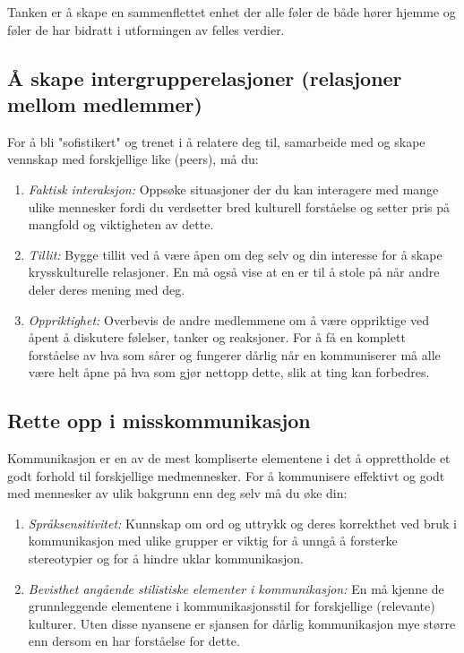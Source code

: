 \documentclass[11pt]{article}
\begin{document}
				Tanken er å skape en sammenflettet enhet der alle føler de både hører hjemme og føler de har bidratt i utformingen av felles verdier.
				
		\subsection{Å skape intergrupperelasjoner (relasjoner mellom medlemmer)}
			For å bli "sofistikert" og trenet i å relatere deg til, samarbeide med og skape vennskap med forskjellige like (peers), må du:
			\begin{enumerate}
				\item \textit{Faktisk interaksjon:} Oppsøke situasjoner der du kan interagere med mange ulike mennesker fordi du verdsetter bred kulturell forståelse og setter pris på mangfold og viktigheten av dette.
				\item \textit{Tillit:} Bygge tillit ved å være åpen om deg selv og din interesse for å skape krysskulturelle relasjoner. En må også vise at en er til å stole på når andre deler deres mening med deg.
				
				\item \textit{Oppriktighet:} Overbevis de andre medlemmene om å være oppriktige ved åpent å diskutere følelser, tanker og reaksjoner. For å få en komplett forståelse av hva som sårer og fungerer dårlig når en kommuniserer må alle være helt åpne på hva som gjør nettopp dette, slik at ting kan forbedres.
			\end{enumerate}
			
		\subsection{Rette opp i misskommunikasjon}
			Kommunikasjon er en av de mest kompliserte elementene i det å opprettholde et godt forhold til forskjellige medmennesker. For å kommunisere effektivt og godt med mennesker av ulik bakgrunn enn deg selv må du øke din:
			
			\begin{enumerate}
				\item \textit{Språksensitivitet:} Kunnskap om ord og uttrykk og deres korrekthet ved bruk i kommunikasjon med ulike grupper er viktig for å unngå å forsterke stereotypier og for å hindre uklar kommunikasjon.
				\item \textit{Bevisthet angående stilistiske elementer i kommunikasjon:} En må kjenne de grunnleggende elementene i kommunikasjonsstil for forskjellige (relevante) kulturer. Uten disse nyansene er sjansen for dårlig kommunikasjon mye større enn dersom en har forståelse for dette.
			\end{enumerate}
			
\end{document}
